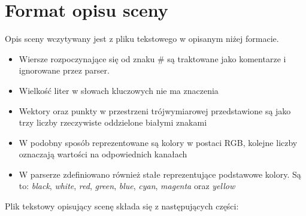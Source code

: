 \documentclass[11pt,a4paper]{article}
\begin{document}
\section{Format opisu sceny}
Opis sceny wczytywany jest z pliku tekstowego w opisanym niżej formacie.
\begin{itemize}
\item Wiersze rozpoczynające się od znaku \# są traktowane jako komentarze i ignorowane przez parser.
\item Wielkość liter w słowach kluczowych nie ma znaczenia
\item Wektory oraz punkty w przestrzeni trójwymiarowej przedstawione są jako trzy liczby rzeczywiste oddzielone białymi znakami
\item W podobny sposób reprezentowane są kolory w postaci RGB, kolejne liczby oznaczają wartości na odpowiednich kanałach
\item W parserze zdefiniowano również stałe reprezentujące podstawowe kolory. Są to: \textit{black}, \textit{white}, \textit{red}, \textit{green}, \textit{blue}, \textit{cyan}, \textit{magenta} oraz \textit{yellow}
\end{itemize}
Plik tekstowy opisujący scenę składa się z następujących części:
\end{document}
